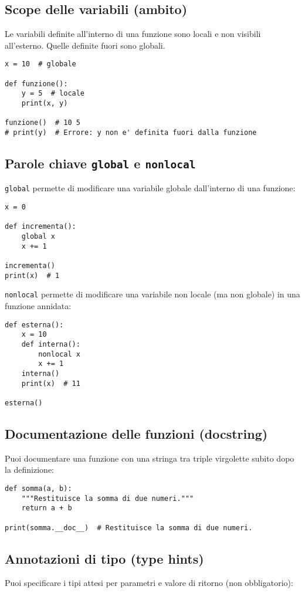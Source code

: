 \documentclass[a4paper,12pt]{article}
\begin{document}
\subsection*{Scope delle variabili (ambito)}
Le variabili definite all’interno di una funzione sono locali e non visibili all’esterno. Quelle definite fuori sono globali.

\begin{lstlisting}
x = 10  # globale

def funzione():
    y = 5  # locale
    print(x, y)

funzione()  # 10 5
# print(y)  # Errore: y non e' definita fuori dalla funzione
\end{lstlisting}

\subsection*{Parole chiave \texttt{global} e \texttt{nonlocal}}
\texttt{global} permette di modificare una variabile globale dall’interno di una funzione:

\begin{lstlisting}
x = 0

def incrementa():
    global x
    x += 1

incrementa()
print(x)  # 1
\end{lstlisting}

\texttt{nonlocal} permette di modificare una variabile non locale (ma non globale) in una funzione annidata:

\begin{lstlisting}
def esterna():
    x = 10
    def interna():
        nonlocal x
        x += 1
    interna()
    print(x)  # 11

esterna()
\end{lstlisting}

\subsection*{Documentazione delle funzioni (docstring)}
Puoi documentare una funzione con una stringa tra triple virgolette subito dopo la definizione:

\begin{lstlisting}
def somma(a, b):
    """Restituisce la somma di due numeri."""
    return a + b

print(somma.__doc__)  # Restituisce la somma di due numeri.
\end{lstlisting}

\subsection*{Annotazioni di tipo (type hints)}
Puoi specificare i tipi attesi per parametri e valore di ritorno (non obbligatorio):
\end{document}
